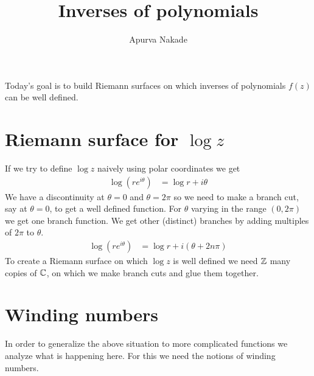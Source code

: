 \DeclareMathOperator{\re}{Re}




\title{Inverses of polynomials}
\author{Apurva Nakade}
\thispagestyle{fancy}
\maketitle




Today's goal is to build Riemann surfaces on which inverses of polynomials $f(z)$ can be well defined.

\section{Riemann surface for $\log z$}
If we try to define $\log z$ naively using polar coordinates we get
\begin{align}
	\log (re^{i \theta}) & = \log r + i \theta
\end{align}
We have a discontinuity at $\theta = 0$ and $\theta = 2 \pi$ so we need to make a branch cut, say at $\theta = 0$, to get a well defined function. For $\theta$ varying in the range $(0,2\pi)$ we get one branch function. We get other (distinct) branches by adding multiples of $2 \pi$ to $\theta$.
\begin{align}
	\log (re^{i \theta}) & = \log r + i (\theta + 2 n \pi)
\end{align}
To create a Riemann surface on which $\log z$ is well defined we need $\mathbb{Z}$ many copies of $\mathbb{C}$, on which we make branch cuts and glue them together.




\section{Winding numbers}
In order to generalize the above situation to more complicated functions we analyze what is happening here. For this we need the notions of winding numbers.

